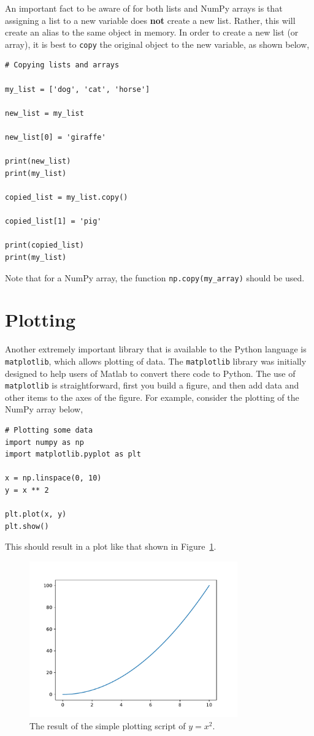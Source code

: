 \documentclass[a4paper]{article}
\begin{document}
An important fact to be aware of for both lists and NumPy arrays is that assigning a list to a new variable does \textbf{not} create a new list.
Rather, this will create an alias to the same object in memory.
In order to create a new list (or array), it is best to \texttt{copy} the original object to the new variable, as shown below,
\begin{lstlisting}
# Copying lists and arrays

my_list = ['dog', 'cat', 'horse']

new_list = my_list

new_list[0] = 'giraffe'

print(new_list)
print(my_list)

copied_list = my_list.copy()

copied_list[1] = 'pig'

print(copied_list)
print(my_list)
\end{lstlisting}
Note that for a NumPy array, the function \texttt{np.copy(my\_array)} should be used.

\section{Plotting}

Another extremely important library that is available to the Python language is \texttt{matplotlib}, which allows plotting of data.
The \texttt{matplotlib} library was initially designed to help users of Matlab to convert there code to Python.
The use of \texttt{matplotlib} is straightforward, first you build a figure, and then add data and other items to the axes of the figure.
For example, consider the plotting of the NumPy array below,
\begin{lstlisting}
# Plotting some data
import numpy as np
import matplotlib.pyplot as plt

x = np.linspace(0, 10)
y = x ** 2

plt.plot(x, y)
plt.show()
\end{lstlisting}
This should result in a plot like that shown in Figure~\ref{fig:x2}.
%
\begin{figure}[t]
\centering
\includegraphics[width=0.8\textwidth]{x_squared}
\caption{\label{fig:x2} The result of the simple plotting script of $y = x ^ 2$.}
\end{figure}
%
\end{document}
